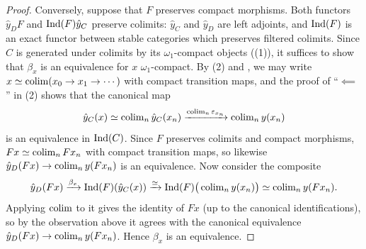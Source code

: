 \begin{proof}
		Conversely, suppose that $F$ preserves compact morphisms. Both functors $\hat{y}_DF$ and $\operatorname{Ind}(F)\hat{y}_C$ preserve colimits: $\hat{y}_C$ and $\hat{y}_D$ are left adjoints, and $\operatorname{Ind}(F)$ is an exact functor between stable categories which preserves filtered colimits. Since $C$ is generated under colimits by its $\omega_1$-compact objects ((1)), it suffices to show that $\beta_x$ is an equivalence for $x$ $\omega_1$-compact. By (2) and , we may write $x \simeq \operatorname{colim}(x_0 \to x_1 \to \cdots)$ with compact transition maps, and the proof of ``$\impliedby$'' in (2) shows that the canonical map
		\[
			\hat{y}_C(x) \simeq \operatorname{colim}_n \hat{y}_C(x_n) \xrightarrow{\operatorname{colim}_n \varepsilon_{x_n}} \operatorname{colim}_n y(x_n)
		\]
		is an equivalence in $\operatorname{Ind}(C)$. Since $F$ preserves colimits and compact morphisms, $Fx \simeq \operatorname{colim}_n Fx_n$ with compact transition maps, so likewise $\hat{y}_D(Fx) \to \operatorname{colim}_n y(Fx_n)$ is an equivalence. Now consider the composite
		\[
			\hat{y}_D(Fx) \xrightarrow{\beta_x} \operatorname{Ind}(F)(\hat{y}_C(x)) \xrightarrow{\simeq} \operatorname{Ind}(F)\big(\operatorname{colim}_n y(x_n)\big) \simeq \operatorname{colim}_n y(Fx_n).
		\]
		Applying $\operatorname{colim}$ to it gives the identity of $Fx$ (up to the canonical identifications), so by the observation above it agrees with the canonical equivalence $\hat{y}_D(Fx) \to \operatorname{colim}_n y(Fx_n)$. Hence $\beta_x$ is an equivalence.
	\end{proof}
